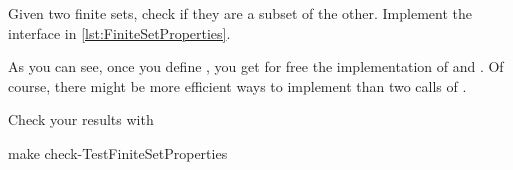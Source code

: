 
\begin{codeexercise}
    Given two finite sets, check if they are a subset of the other.
    Implement the interface in \cref{lst:FiniteSetProperties}.

\end{codeexercise}


As you can see, once you define , you get for free the implementation of  and .
Of course, there might be more efficient ways to implement  than two calls of .

Check your results with

\begin{console}
    make check-TestFiniteSetProperties
\end{console}
